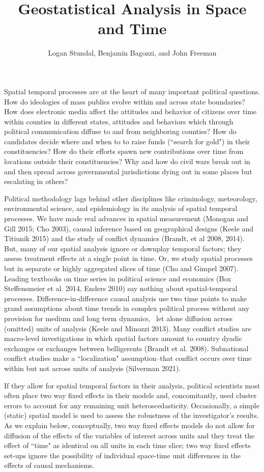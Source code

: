 \documentclass[12pt]{article}
\title{Geostatistical Analysis in Space and Time}
\author{Logan Stundal, Benjamin Bagozzi, and John Freeman}
\begin{document}
\maketitle
\doublespace


Spatial temporal processes are at the heart of many important political questions. How do ideologies of mass publics evolve within and across state boundaries? How does electronic media affect the attitudes and behavior of citizens over time within counties in different states, attitudes and behaviors which through political communication diffuse to and from neighboring counties? How do candidates decide where and when to to raise funds (``search for gold") in their constituencies? How do their efforts spawn new contributions over time from locations outside their constituencies? Why and how do civil wars break out in and then spread across governmental jurisdictions dying out in some places but escalating in others?

Political methodology lags behind other disciplines like criminology, meteorology, environmental
science, and epidemiology in its analysis of spatial temporal processes. We have made
real advances in spatial measurement (Monogan and Gill 2015; Cho 2003), causal inference based
on geographical designs (Keele and Titiunik 2015) and the study of conflict
dynamics (Brandt, et al 2008, 2014). But, many of our spatial analysis ignore or
downplay temporal factors; they assess treatment effects at a single point in time. Or, we
study spatial processes but in separate or highly aggregated slices of time (Cho and Gimpel 2007).
Leading textbooks on time series in political science and economics
(Box Steffensmeier et al. 2014, Enders 2010) say nothing about spatial-temporal
processes. Difference-in-difference causal analysis use two time points to
make grand assumptions about time trends in
complex political process without any provision for medium and long term dynamics, \
let alone diffusion across (omitted) units of analysis (Keele and Minozzi 2013).
Many conflict studies are macro-level investigations in which spatial factors
amount to country dyadic exchanges or exchanges between  belligerents (Brandt et al. 2008). Subnational
conflict studies make a ``localization" assumption--that conflict occurs over time within
but not across units of analysis (Silverman 2021).

If they allow for spatial temporal factors in their analysis, political scientists most
often place two way fixed effects in their models and, concomitantly, used cluster errors
to account for any remaining unit heteroscedasticity. Occasionally, a
simple (static) spatial model is used to assess the robustness of the
investigator's results. As we explain below, conceptually, two way fixed effects models
do not allow for diffusion of the effects of the variables of interest across
units and they treat the effect of ``time" as identical on all units in each
time slice; two way fixed effects set-ups ignore the possibility of individual
space-time unit differences in the effects of causal mechanisms.
\end{document}
